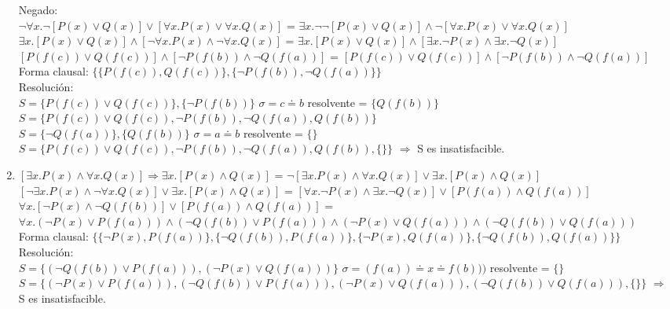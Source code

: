 \documentclass[10pt,a4paper]{article}
\begin{document}
\begin{enumerate}
    Negado: \\
    $ \neg \forall x. \neg [P(x) \vee Q(x)] \vee [\forall x. P(x) \vee \forall x. Q(x)]$  =  $ \exists x. \neg \neg [P(x) \vee Q(x)] \wedge \neg [\forall x. P(x) \vee \forall x. Q(x)]$ \\
    $ \exists x. [P(x) \vee Q(x)] \wedge [\neg \forall x. P(x) \wedge \neg \forall x. Q(x)]$  =  $ \exists x. [P(x) \vee Q(x)] \wedge [\exists x. \neg P(x) \wedge \exists x. \neg Q(x)]$ \\
    $ [P(f(c)) \vee Q(f(c))] \wedge [\neg P(f(b)) \wedge \neg Q(f(a))]$  =  $ [P(f(c)) \vee Q(f(c))] \wedge [\neg P(f(b)) \wedge \neg Q(f(a))]$ \\
    Forma clausal: $\{ \{P(f(c)), Q(f(c))\}, \{ \neg P(f(b)), \neg Q(f(a))\} \}$ \\
    Resolución:\\
    $S=\{P(f(c)) \vee Q(f(c))\},\{ \neg P(f(b))\}$ $\sigma= c \doteq b$ resolvente = $\{Q(f(b))\}$ \\
    $S=\{ P(f(c)) \vee Q(f(c)), \neg P(f(b)), \neg Q(f(a)), Q(f(b)) \}$ \\
    $S=\{ \neg Q(f(a))\},\{Q(f(b)) \}$ $ \sigma= a \doteq b$ resolvente = $ \{\} $
    $S=\{ P(f(c)) \vee Q(f(c)), \neg P(f(b)), \neg Q(f(a)), Q(f(b)), \{\} \}$ $\Rightarrow$ S es insatisfacible.
    \item
    $ [\exists x. P(x) \wedge \forall x. Q(x)] \Rightarrow \exists x. [P(x) \wedge Q(x)] $  =  $ \neg [\exists x. P(x) \wedge \forall x. Q(x)] \vee \exists x. [P(x) \wedge Q(x)] $ \\
    $ [\neg \exists x. P(x) \wedge \neg \forall x. Q(x)] \vee \exists x. [P(x) \wedge Q(x)] $  =  $ [\forall x. \neg P(x) \wedge \exists x. \neg Q(x)] \vee [P(f(a)) \wedge Q(f(a))] $ \\
    $ \forall x. [\neg P(x) \wedge \neg Q(f(b))] \vee [P(f(a)) \wedge Q(f(a))] $  =  $ \forall x. (\neg P(x) \vee P(f(a))) \wedge (\neg Q(f(b)) \vee P(f(a))) \wedge (\neg P(x)\vee Q(f(a))) \wedge (\neg Q(f(b)) \vee Q(f(a))) $ \\
    Forma clausal: $\{ \{ \neg P(x), P(f(a))\}, \{ \neg Q(f(b)), P(f(a))\}, \{ \neg P(x), Q(f(a))\}, \{ \neg Q(f(b)), Q(f(a))\}\}$
    Resolución: \\
    $S=\{(\neg Q(f(b)) \vee P(f(a))), (\neg P(x)\vee Q(f(a)))\}$ $\sigma=(f(a)) \doteq x \doteq f(b)))$ resolvente = $ \{\} $ \\
    $S=\{ (\neg P(x) \vee P(f(a))), (\neg Q(f(b)) \vee P(f(a))), (\neg P(x)\vee Q(f(a))), (\neg Q(f(b)) \vee Q(f(a))), \{\}\}$ $\Rightarrow$ S es insatisfacible.

\end{enumerate}
\end{document}
